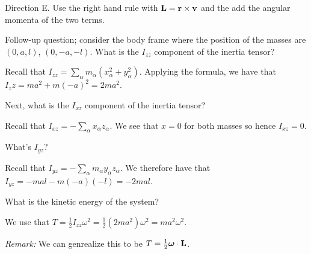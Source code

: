 \begin{s}
Direction E. Use the right hand rule with $\mathbf{L} = \mathbf{r} \times \mathbf{v}$ and the add the angular momenta of the two terms.
\end{s}
Follow-up question; consider the body frame where the position of the masses are $(0, a, l)$, $(0, -a, -l)$. What is the $I_{zz}$ component of the inertia tensor?
\begin{s}
Recall that $I_{zz} = \sum_\alpha m_\alpha(x_\alpha^2 + y_\alpha^2)$. Applying the formula, we have that $I_zz = ma^2 + m(-a)^2 = 2ma^2$.
\end{s}
\noindent Next, what is the $I_{xz}$ component of the inertia tensor?
\begin{s}
Recall that $I_{xz} = -\sum_\alpha x_\alpha z_\alpha$. We see that $x = 0$ for both masses so hence $I_{xz} = 0$.
\end{s}
\noindent What's $I_{yz}$?
\begin{s}
Recall that $I_{yz} = -\sum_\alpha m_\alpha y_\alpha z_\alpha$. We therefore have that $I_{yz} = -mal - m(-a)(-l) = -2mal$.
\end{s}
\noindent What is the kinetic energy of the system?
\begin{s}
We use that $T = \frac{1}{2}I_{zz}\omega^2 = \frac{1}{2}(2ma^2)\omega^2 = ma^2\omega^2$.
\end{s}
\noindent \textit{Remark:} We can genrealize this to be $T = \frac{1}{2}\bm{\omega} \cdot \mathbf{L}$.

